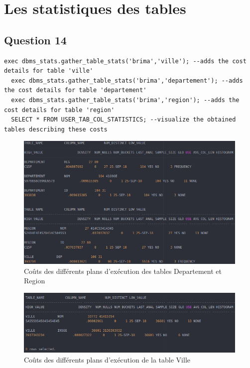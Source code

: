 \documentclass[a4paper,12pt]{article}
\begin{document}
\newpage

\section{Les statistiques des tables}
\subsection{Question 14}
\begin{lstlisting}[caption={requêtes permettant de recalculer les statistiques sur les tables Ville, Departement et Region afin de visualiser les coûts des différents plans d'exécution qui y sont associés}]
  exec dbms_stats.gather_table_stats('brima','ville'); --adds the cost details for table 'ville'
  exec dbms_stats.gather_table_stats('brima','departement'); --adds the cost details for table 'departement'
  exec dbms_stats.gather_table_stats('brima','region'); --adds the cost details for table 'region'
  SELECT * FROM USER_TAB_COL_STATISTICS; --visualize the obtained tables describing these costs
\end{lstlisting}

\begin{figure}[!ht]
  \centering
  \includegraphics[scale=0.55]{images/q14_1.png}
  \caption{Coûts des différents plans d'exécution des tables Departement et Region}
\end{figure}

\begin{figure}[!ht]
  \centering
  \includegraphics[scale=0.55]{images/q14_2.png}
  \caption{Coûts des différents plans d'exécution de la table Ville}
\end{figure}
\end{document}
